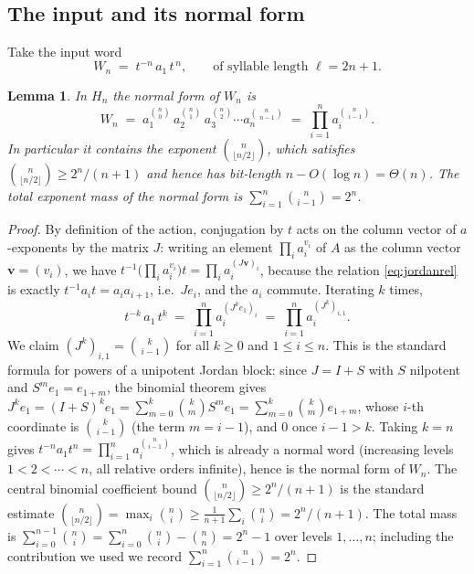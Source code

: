 \documentclass{amsart}
\newtheorem{lemma}{Lemma}
\theoremstyle{definition}
\begin{document}
\subsection*{The input and its normal form}
Take the input word
\begin{equation}\label{eq:input}
W_n \;=\; t^{-n}\,a_1\,t^{\,n},\qquad\text{of syllable length }\ell=2n+1.
\end{equation}

\begin{lemma}\label{lem:binom}
In $H_n$ the normal form of $W_n$ is
\[
W_n \;=\; a_1^{\binom n0}\,a_2^{\binom n1}\,a_3^{\binom n2}\cdots a_{n}^{\binom{n}{\,n-1}}
\;=\;\prod_{i=1}^{n} a_i^{\binom{n}{\,i-1}} .
\]
In particular it contains the exponent $\binom{n}{\lfloor n/2\rfloor}$, which satisfies
$\binom{n}{\lfloor n/2\rfloor}\ge 2^{n}/(n+1)$ and hence has bit-length $n-O(\log n)=\Theta(n)$.
The total exponent mass of the normal form is $\sum_{i=1}^n\binom{n}{i-1}=2^{n}$.
\end{lemma}

\begin{proof}
By definition of the action, conjugation by $t$ acts on the column vector of $a$-exponents by
the matrix $J$: writing an element $\prod_i a_i^{v_i}$ of $A$ as the column vector
$\mathbf v=(v_i)$, we have $t^{-1}\bigl(\prod_i a_i^{v_i}\bigr)t=\prod_i a_i^{(J\mathbf v)_i}$,
because the relation \eqref{eq:jordanrel} is exactly $t^{-1}a_i t=a_ia_{i+1}$, i.e.\ $J e_i$,
and the $a_i$ commute. Iterating $k$ times,
\[
t^{-k}\,a_1\,t^{k}\;=\;\prod_{i=1}^{n} a_i^{(J^{k}e_1)_i}\;=\;\prod_{i=1}^{n} a_i^{(J^k)_{i,1}} .
\]
We claim $(J^k)_{i,1}=\binom{k}{\,i-1}$ for all $k\ge0$ and $1\le i\le n$. This is the standard
formula for powers of a unipotent Jordan block: since $J=I+S$ with $S$ nilpotent and
$S^{m}e_1=e_{1+m}$, the binomial theorem gives $J^{k}e_1=(I+S)^{k}e_1=\sum_{m=0}^{k}\binom km
S^{m}e_1=\sum_{m=0}^{k}\binom km e_{1+m}$, whose $i$-th coordinate is $\binom{k}{\,i-1}$
(the term $m=i-1$), and $0$ once $i-1>k$. Taking $k=n$ gives
$t^{-n}a_1 t^{n}=\prod_{i=1}^n a_i^{\binom{n}{i-1}}$, which is already a normal word (increasing
levels $1<2<\cdots<n$, all relative orders infinite), hence is the normal form of $W_n$. The
central binomial coefficient bound $\binom{n}{\lfloor n/2\rfloor}\ge 2^n/(n+1)$ is the standard
estimate $\binom{n}{\lfloor n/2\rfloor}=\max_i\binom ni\ge\frac1{n+1}\sum_i\binom ni=2^n/(n+1)$.
The total mass is $\sum_{i=0}^{n-1}\binom ni=\sum_{i=0}^n\binom ni-\binom nn=2^n-1$ over levels
$1,\dots,n$; including the contribution we used we record $\sum_{i=1}^n\binom n{i-1}=2^n$.
\end{proof}
\end{document}
